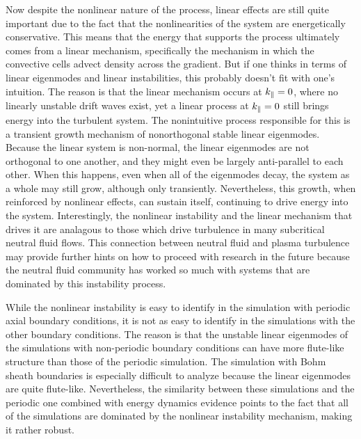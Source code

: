 Now despite the nonlinear nature of the process, linear effects are still quite important due to the fact that the nonlinearities of the system are energetically conservative.
This means that the energy that supports the process ultimately comes from a linear mechanism, specifically the mechanism in which the convective cells advect density across the gradient. 
But if one thinks in terms of linear eigenmodes and linear instabilities, this probably doesn't fit with one's intuition. 
The reason is that the linear mechanism occurs at $k_\parallel = 0$, where no linearly unstable drift
waves exist, yet a linear process at $k_\parallel = 0$ still brings energy into the turbulent system. The nonintuitive process responsible for this is a transient growth mechanism of nonorthogonal
stable linear eigenmodes. Because the linear system is non-normal, the linear eigenmodes are not orthogonal to one another, and they might even be largely anti-parallel to each other.
When this happens, even when all of the eigenmodes decay, the system as a whole may still grow, although only transiently. Nevertheless, this growth, when reinforced by nonlinear
effects, can sustain itself, continuing to drive energy into the system. Interestingly, the nonlinear instability and the linear mechanism that drives it are analagous to those which drive turbulence
in many subcritical neutral fluid flows. This connection between neutral fluid and plasma turbulence may provide further hints on how to proceed with research in the future because the neutral
fluid community has worked so much with systems that are dominated by this instability process.

While the nonlinear instability is easy to identify in the simulation with periodic axial boundary conditions, it is not as easy to identify in the simulations with the other boundary conditions. The reason is
that the unstable linear eigenmodes of the simulations with non-periodic boundary conditions can have more flute-like structure than those of the periodic simulation. The simulation with Bohm
sheath boundaries is especially difficult to analyze because the linear eigenmodes are quite flute-like. Nevertheless, the similarity between these simulations and the periodic one combined
with energy dynamics evidence points to the fact that all of the simulations are dominated by the nonlinear instability mechanism, making it rather robust.

